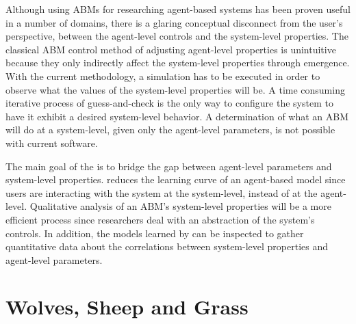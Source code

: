 Although using ABMs for researching agent-based systems has been proven useful in a number of domains, there is a glaring conceptual disconnect from the user's perspective, between the agent-level controls and the system-level properties.
The classical ABM control method of adjusting agent-level properties is unintuitive because they only indirectly affect the system-level properties through emergence.
With the current methodology, a simulation has to be executed in order to observe what the values of the system-level properties will be.
A time consuming iterative process of guess-and-check is the only way to configure the system to have it exhibit a desired system-level behavior.
A determination of what an ABM will do at a system-level, given only the agent-level parameters, is not possible with current software.

The main goal of the \framework is to bridge the gap between agent-level parameters and system-level properties.
\fw reduces the learning curve of an agent-based model since users are interacting with the system at the system-level, instead of at the agent-level.
Qualitative analysis of an ABM's system-level properties will be a more efficient process since researchers deal with an abstraction of the system's controls.
In addition, the models learned by \fw can be inspected to gather quantitative data about the correlations between system-level properties and agent-level parameters.


\section{Wolves, Sheep and Grass}

